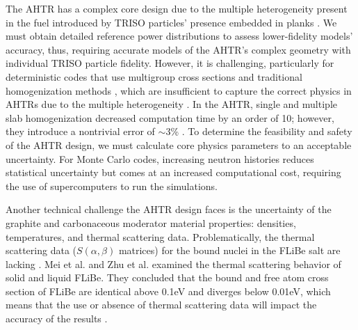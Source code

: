 The \gls{AHTR} has a complex core design due to the multiple heterogeneity 
present in the fuel introduced by \gls{TRISO} particles' presence embedded in 
planks \cite{ramey_monte_2018,rahnema_phenomena_2019}.
We must obtain detailed reference power distributions to assess lower-fidelity 
models' accuracy, thus, requiring accurate models of the \gls{AHTR}'s complex 
geometry with individual \gls{TRISO} particle fidelity.
However, it is challenging, particularly for deterministic codes that
use multigroup cross sections and traditional homogenization methods
\cite{ramey_monte_2018}, which are insufficient to capture the correct physics 
in \glspl{AHTR} due to the multiple heterogeneity \cite{ramey_monte_2018}. 
In the \gls{AHTR}, single and multiple slab homogenization decreased computation time 
by an order of 10; however, they introduce a nontrivial error of $\sim$3\%
\cite{ramey_monte_2018,cisneros_neutronics_2012}.
To determine the feasibility and safety of the \gls{AHTR} design, we must 
calculate core physics parameters to an acceptable uncertainty. 
For Monte Carlo codes, increasing neutron histories reduces statistical 
uncertainty but comes at an increased computational cost, requiring the use of 
supercomputers to run the simulations.

Another technical challenge the \gls{AHTR} design faces is the uncertainty of 
the graphite and carbonaceous moderator material properties: densities, 
temperatures, and thermal scattering data.
Problematically, the thermal scattering data ($S(\alpha,\beta)$ matrices) for 
the bound nuclei in the \gls{FLiBe} salt are lacking \cite{ramey_monte_2018}. 
Mei et al. \cite{mei_investigation_2013} and Zhu et al. \cite{zhu_thermal_2017} 
examined the thermal scattering behavior of solid and liquid \gls{FLiBe}.
They concluded that the bound and free atom cross section of \gls{FLiBe} are 
identical above 0.1eV and diverges below 0.01eV, which means that the use or 
absence of thermal scattering data will impact the accuracy of the results 
\cite{ramey_monte_2018}. 


